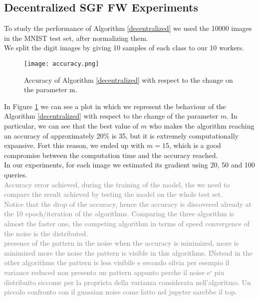 \subsection{Decentralized SGF FW Experiments}
To study the performance of Algorithm \ref{decentralized} we used the 10000 images in the MNIST test set, after normalizing them.\\ We split the digit images by giving 10 samples of each class to our 10 workers.
\begin{figure}[htbp]
	\centering
	\texttt{[image: accuracy.png]}
	\caption{Accuracy of Algorithm \ref{decentralized} with respect to the change on the parameter m.}
	\label{fig:accuracy}
\end{figure}
In Figure \ref{fig:accuracy} we can see a plot in which we represent the behaviour of the Algorithm \ref{decentralized} with respect to the change of the parameter $m$. In particular, we can see that the best value of $m$ who makes the algorithm reaching an accuracy of approximately 20\% is 35, but it is extremely computationally expansive. Fort this reason, we ended up with $m=15$, which is a good compromise between the computation time and the accuracy reached.\\
In our experiments, for each image we estimated its gradient using 20, 50 and 100 queries.\\

\textcolor{gray}{Accuracy error achieved, during the training of the model, the we need to compare the result achieved by testing the model on the whole test set.\\ Notice that the drop of the accuracy, hence the accuracy is discovered already at the 10 epoch/iteration of the algorithms. Comparing the three algorithm is almost the faster one, the competing algorithm in terms of speed convergence of the noise is the distributed.
\\ presence of the pattern in the noise when the accuracy is minimized, more is minimized more the noise the pattern is visible in this algorithms. INstead in the other algorithms the pattern is less visibile e secondo silvia per esempio il variance reduced non presenta un pattern appunto perche il noise e` piu distribuito siccome per la proprieta della varianza considerata nell'algoritmo.
Un piccolo confronto con il guassian noise come fatto nel jupyter sarebbe il top.
}


